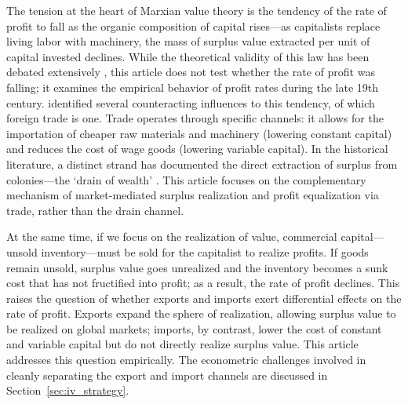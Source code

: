 \documentclass[10pt]{article}
\begin{document}
\par The tension at the heart of Marxian value theory is the tendency of the rate of profit to fall as the organic composition of capital rises---as capitalists replace living labor with machinery, the mass of surplus value extracted per unit of capital invested declines. While the theoretical validity of this law has been debated extensively \citep{okishio1961technical, foley1986understanding, BasuManolakos2013}, this article does not test whether the rate of profit was falling; it examines the empirical behavior of profit rates during the late 19th century. \citet{marx1894-counteracting} identified several counteracting influences to this tendency, of which foreign trade is one. Trade operates through specific channels: it allows for the importation of cheaper raw materials and machinery (lowering constant capital) and reduces the cost of wage goods (lowering variable capital). In the historical literature, a distinct strand has documented the direct extraction of surplus from colonies---the `drain of wealth' \citep{bora2025drain, patnaik2000new, naoroji1901poverty, nogues2021measuring}. This article focuses on the complementary mechanism of market-mediated surplus realization and profit equalization via trade, rather than the drain channel.

\par At the same time, if we focus on the realization of value, commercial capital---unsold inventory---must be sold for the capitalist to realize profits. If goods remain unsold, surplus value goes unrealized and the inventory becomes a sunk cost that has not fructified into profit; as a result, the rate of profit declines. This raises the question of whether exports and imports exert differential effects on the rate of profit. Exports expand the sphere of realization, allowing surplus value to be realized on global markets; imports, by contrast, lower the cost of constant and variable capital but do not directly realize surplus value. This article addresses this question empirically. The econometric challenges involved in cleanly separating the export and import channels are discussed in Section~\ref{sec:iv_strategy}.
\end{document}
